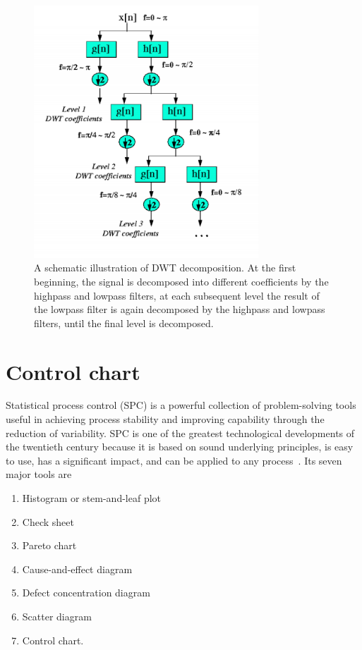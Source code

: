 \begin{figure}[h]
\centering
\includegraphics[width=0.75\textwidth]{images/dwt1.PNG}
\caption[DWT decomposition algorithms]{A schematic illustration of DWT decomposition. At the first beginning, the signal is decomposed into different coefficients by the highpass and lowpass filters, at each subsequent level the result of the lowpass filter is again decomposed  by the highpass and lowpass filters, until the final level is decomposed.}
\label{fig:dwt1}
\end{figure}





\section{Control chart}

Statistical process control (SPC) is a powerful collection of problem-solving
tools useful in achieving process stability and improving capability through the reduction of variability.
SPC is one of the greatest technological developments of the twentieth century because it is based on sound underlying principles, is easy to use, has a significant impact, and can be applied to any process~\cite{montgomery2020introduction}. Its seven major tools are
\begin{enumerate}
    \item Histogram or stem-and-leaf plot
    \item Check sheet
    \item Pareto chart
    \item Cause-and-effect diagram
    \item Defect concentration diagram
    \item Scatter diagram
    \item Control chart.
\end{enumerate}

